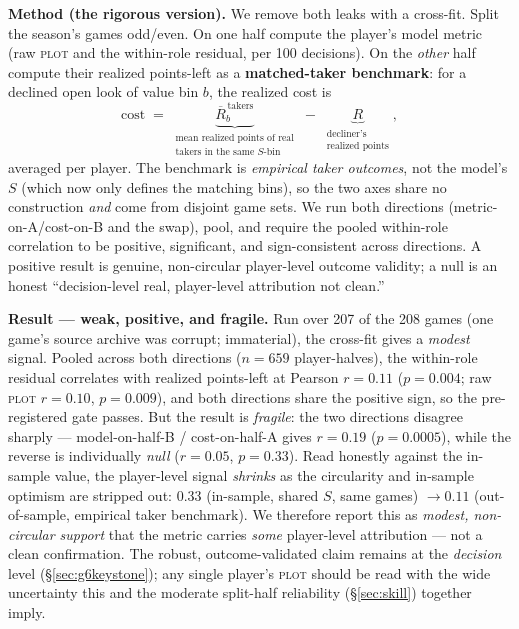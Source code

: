 \documentclass[11pt]{article}
\newcommand{\plot}{\textsc{plot}}
\begin{document}
\textbf{Method (the rigorous version).} We remove both leaks with a cross-fit. Split the season's games
odd/even. On one half compute the player's model metric (raw \plot{} and the within-role residual, per
100 decisions). On the \emph{other} half compute their realized points-left as a \textbf{matched-taker
benchmark}: for a declined open look of value bin $b$, the realized cost is
\begin{equation}
  \text{cost} \;=\; \underbrace{\overline{R}^{\,\text{takers}}_{b}}_{\substack{\text{mean realized points of real}\\\text{takers in the same }S\text{-bin}}} \;-\; \underbrace{R}_{\substack{\text{decliner's}\\\text{realized points}}},
\end{equation}
averaged per player. The benchmark is \emph{empirical taker outcomes}, not the model's $S$ (which now only
defines the matching bins), so the two axes share no construction \emph{and} come from disjoint game sets. We run both directions
(metric-on-A/cost-on-B and the swap), pool, and require the pooled within-role correlation to be positive,
significant, and sign-consistent across directions. A positive result is genuine, non-circular
player-level outcome validity; a null is an honest ``decision-level real, player-level attribution not
clean.''

\textbf{Result --- weak, positive, and fragile.} Run over 207 of the 208 games (one game's source
archive was corrupt; immaterial), the cross-fit gives a \emph{modest} signal. Pooled across both
directions ($n=659$ player-halves), the within-role residual correlates with realized points-left at
Pearson $r=0.11$ ($p=0.004$; raw \plot{} $r=0.10$, $p=0.009$), and both directions share the positive
sign, so the pre-registered gate passes. But the result is \emph{fragile}: the two directions disagree
sharply --- model-on-half-B / cost-on-half-A gives $r=0.19$ ($p=0.0005$), while the reverse is
individually \emph{null} ($r=0.05$, $p=0.33$). Read honestly against the in-sample value, the
player-level signal \emph{shrinks} as the circularity and in-sample optimism are stripped out:
$0.33$ (in-sample, shared $S$, same games) $\rightarrow 0.11$ (out-of-sample, empirical taker benchmark).
We therefore report this as \emph{modest, non-circular support} that the metric carries \emph{some}
player-level attribution --- not a clean confirmation. The robust, outcome-validated claim remains at
the \emph{decision} level (\S\ref{sec:g6keystone}); any single player's \plot{} should be read with the
wide uncertainty this and the moderate split-half reliability (\S\ref{sec:skill}) together imply.
\end{document}

